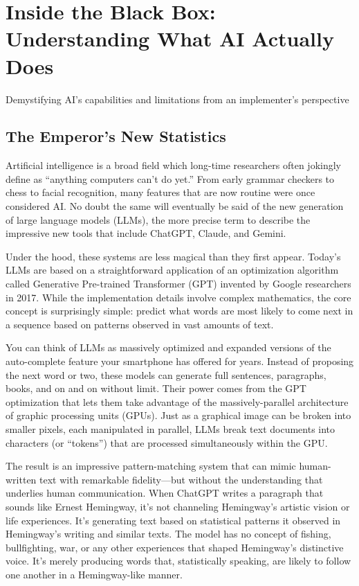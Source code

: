 \documentclass[
  Letterpaper,
]{scrbook}
\begin{document}

\chapter{Inside the Black Box: Understanding What AI Actually
Does}\label{inside-the-black-box-understanding-what-ai-actually-does}

Demystifying AI's capabilities and limitations from an implementer's
perspective

\hfill\break

\section{The Emperor's New
Statistics}\label{the-emperors-new-statistics}

Artificial intelligence is a broad field which long-time researchers
often jokingly define as ``anything computers can't do yet.'' From early
grammar checkers to chess to facial recognition, many features that are
now routine were once considered AI. No doubt the same will eventually
be said of the new generation of large language models (LLMs), the more
precise term to describe the impressive new tools that include ChatGPT,
Claude, and Gemini.

Under the hood, these systems are less magical than they first appear.
Today's LLMs are based on a straightforward application of an
optimization algorithm called Generative Pre-trained Transformer (GPT)
invented by Google researchers in 2017. While the implementation details
involve complex mathematics, the core concept is surprisingly simple:
predict what words are most likely to come next in a sequence based on
patterns observed in vast amounts of text.

You can think of LLMs as massively optimized and expanded versions of
the auto-complete feature your smartphone has offered for years. Instead
of proposing the next word or two, these models can generate full
sentences, paragraphs, books, and on and on without limit. Their power
comes from the GPT optimization that lets them take advantage of the
massively-parallel architecture of graphic processing units (GPUs). Just
as a graphical image can be broken into smaller pixels, each manipulated
in parallel, LLMs break text documents into characters (or ``tokens'')
that are processed simultaneously within the GPU.

The result is an impressive pattern-matching system that can mimic
human-written text with remarkable fidelity---but without the
understanding that underlies human communication. When ChatGPT writes a
paragraph that sounds like Ernest Hemingway, it's not channeling
Hemingway's artistic vision or life experiences. It's generating text
based on statistical patterns it observed in Hemingway's writing and
similar texts. The model has no concept of fishing, bullfighting, war,
or any other experiences that shaped Hemingway's distinctive voice. It's
merely producing words that, statistically speaking, are likely to
follow one another in a Hemingway-like manner.
\end{document}
